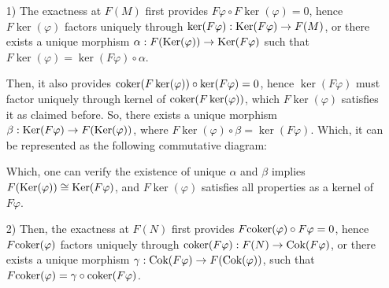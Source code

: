 \documentclass{article}
\newcommand{\coker}{\textmd{coker}}
\newcommand{\Ker}{\textmd{Ker}}
\newcommand{\Cok}{\textmd{Cok}}
\begin{document}
\begin{itemize}
    \item[1)] The exactness at $F(M)$ first provides $F\varphi \circ F\ker(\varphi)=0$, hence $F\ker(\varphi)$ factors uniquely through $\ker(F\varphi):\Ker(F\varphi)\rightarrow F(M)$, or there exists a unique morphism $\alpha:F(\Ker(\varphi))\rightarrow \Ker(F\varphi)$ such that $F\ker(\varphi)=\ker(F\varphi)\circ \alpha$.
    
    Then, it also provides $\coker(F\ker(\varphi))\circ \ker(F\varphi)=0$, hence $\ker(F\varphi)$ must factor uniquely through kernel of $\coker(F\ker(\varphi))$, which $F\ker(\varphi)$ satisfies it as claimed before. So, there exists a unique morphism $\beta:\Ker(F\varphi)\rightarrow F(\Ker(\varphi))$, where $F\ker(\varphi)\circ \beta = \ker(F\varphi)$. Which, it can be represented as the following commutative diagram:
    \begin{center}
    \end{center}
    Which, one can verify the existence of unique $\alpha$ and $\beta$ implies $F(\Ker(\varphi))\cong \Ker(F\varphi)$, and $F\ker(\varphi)$ satisfies all properties as a kernel of $F\varphi$.

    \item[2)] Then, the exactness at $F(N)$ first provides $F\coker(\varphi)\circ F\varphi=0$, hence $F\coker(\varphi)$ factors uniquely through $\coker(F\varphi):F(N)\rightarrow \Cok(F\varphi)$, or there exists a unique morphism $\gamma:\Cok(F\varphi)\rightarrow F(\Cok(\varphi))$, such that $F\coker(\varphi)=\gamma\circ \coker(F\varphi)$.
    

\end{itemize}
\end{document}
